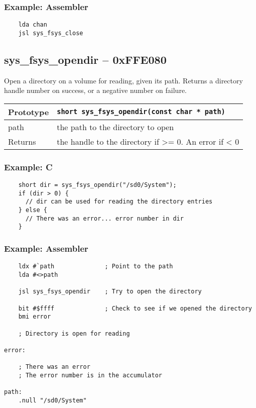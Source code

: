 \subsubsection*{Example: Assembler}
\begin{verbatim}
    lda chan
    jsl sys_fsys_close
\end{verbatim}


\subsection*{sys\_fsys\_opendir -- 0xFFE080}
Open a directory on a volume for reading, given its path.
Returns a directory handle number on success, or a negative number on failure.

\bigskip

\begin{tabular}{|l||l|} \hline
Prototype & \lstinline!short sys_fsys_opendir(const char * path)! \\ \hline
path & the path to the directory to open \\ \hline
Returns & the handle to the directory if >= 0. An error if < 0 \\ \hline
\end{tabular}

\subsubsection*{Example: C}
\begin{lstlisting}
    short dir = sys_fsys_opendir("/sd0/System");
    if (dir > 0) {
      // dir can be used for reading the directory entries
    } else {
      // There was an error... error number in dir
    }    
\end{lstlisting}

\subsubsection*{Example: Assembler}
\begin{verbatim}
    ldx #`path              ; Point to the path
    lda #<>path

    jsl sys_fsys_opendir    ; Try to open the directory

    bit #$ffff              ; Check to see if we opened the directory
    bmi error

    ; Directory is open for reading

error:

    ; There was an error
    ; The error number is in the accumulator

path:
    .null "/sd0/System"
\end{verbatim}


